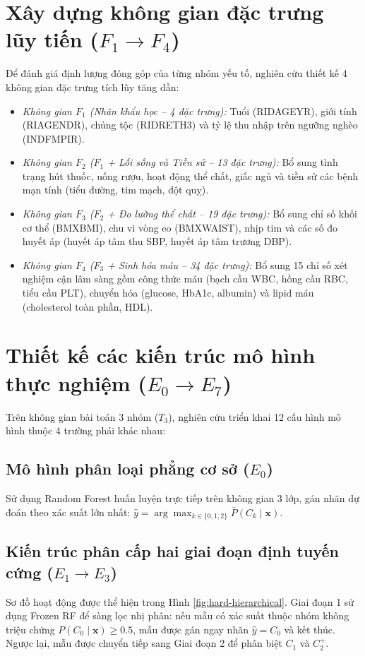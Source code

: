 \section{Xây dựng không gian đặc trưng lũy tiến ($F_1 \to F_4$)}
\label{sec:khong-gian-dac-trung}

Để đánh giá định lượng đóng góp của từng nhóm yếu tố, nghiên cứu thiết kế 4 không gian đặc trưng tích lũy tăng dần:
\begin{itemize}
    \item \textit{Không gian $F_1$ (Nhân khẩu học -- 4 đặc trưng):} Tuổi (RIDAGEYR), giới tính (RIAGENDR), chủng tộc (RIDRETH3) và tỷ lệ thu nhập trên ngưỡng nghèo (INDFMPIR).
    \item \textit{Không gian $F_2$ ($F_1$ + Lối sống và Tiền sử -- 13 đặc trưng):} Bổ sung tình trạng hút thuốc, uống rượu, hoạt động thể chất, giấc ngủ và tiền sử các bệnh mạn tính (tiểu đường, tim mạch, đột quỵ).
    \item \textit{Không gian $F_3$ ($F_2$ + Đo lường thể chất -- 19 đặc trưng):} Bổ sung chỉ số khối cơ thể (BMXBMI), chu vi vòng eo (BMXWAIST), nhịp tim và các số đo huyết áp (huyết áp tâm thu SBP, huyết áp tâm trương DBP).
    \item \textit{Không gian $F_4$ ($F_3$ + Sinh hóa máu -- 34 đặc trưng):} Bổ sung 15 chỉ số xét nghiệm cận lâm sàng gồm công thức máu (bạch cầu WBC, hồng cầu RBC, tiểu cầu PLT), chuyển hóa (glucose, HbA1c, albumin) và lipid máu (cholesterol toàn phần, HDL).
\end{itemize}

\section{Thiết kế các kiến trúc mô hình thực nghiệm ($E_0 \to E_7$)}
\label{sec:thiet-ke-mo-hinh}

Trên không gian bài toán 3 nhóm ($T_3$), nghiên cứu triển khai 12 cấu hình mô hình thuộc 4 trường phái khác nhau:

\subsection{Mô hình phân loại phẳng cơ sở ($E_0$)}
Sử dụng Random Forest huấn luyện trực tiếp trên không gian 3 lớp, gán nhãn dự đoán theo xác suất lớn nhất: $\hat{y} = \arg\max_{k \in \{0, 1, 2\}} \bar{P}(C_k \mid \mathbf{x})$.

\subsection{Kiến trúc phân cấp hai giai đoạn định tuyến cứng ($E_1 \to E_3$)}
Sơ đồ hoạt động được thể hiện trong Hình \ref{fig:hard-hierarchical}. Giai đoạn 1 sử dụng Frozen RF để sàng lọc nhị phân: nếu mẫu có xác suất thuộc nhóm không triệu chứng $P(C_0 \mid \mathbf{x}) \ge 0.5$, mẫu được gán ngay nhãn $\hat{y} = C_0$ và kết thúc. Ngược lại, mẫu được chuyển tiếp sang Giai đoạn 2 để phân biệt $C_1$ và $C_2^+$. 

